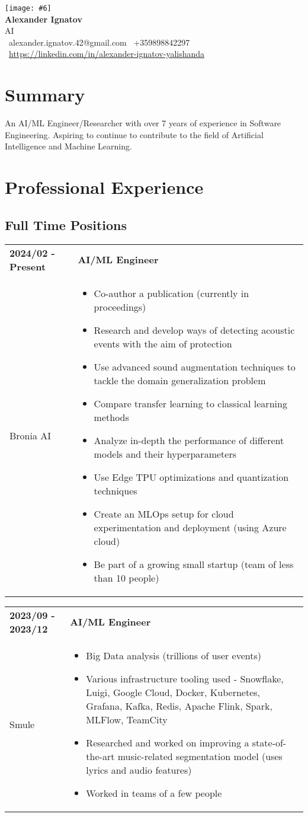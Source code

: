 \documentclass[11pt,a4paper]{article}
\newcommand{\cvheader}[6]{
    \begin{center}
        \texttt{[image: \#6]} \\[4pt]
            {\Huge\textbf{#1}}\\[4pt]
            {\large #2}\\[2pt]
            \faEnvelope\ #3 \quad \faPhone\ #4 \\[2pt]
            \faLinkedin\ \href{#5}{#5}
    \end{center}
}
\newcommand{\workblock}[4]{
    \begin{tabular}{p{0.25\columnwidth}p{0.65\columnwidth}}
        \textbf{#1} & \textbf{#2} \\
        #3 & #4 \\
    \end{tabular}
}
\begin{document}
\cvheader{Alexander Ignatov}
         {AI}
         {alexander.ignatov.42@gmail.com}
         {+359898842297}
         {https://linkedin.com/in/alexander-ignatov-yalishanda}
         {az.jpg}


\section{Summary}
An AI/ML Engineer/Researcher with over 7 years of experience in Software Engineering.
Aspiring to continue to contribute to the field of Artificial Intelligence and Machine Learning.

\section{Professional Experience}
    \subsection{Full Time Positions}
    \workblock{2024/02 - Present}{AI/ML Engineer}
    {Bronia AI}{
        \begin{itemize}
            \item Co-author a publication (currently in proceedings)
            \item Research and develop ways of detecting acoustic events with the aim of protection
            \item Use advanced sound augmentation techniques to tackle the domain generalization problem
            \item Compare transfer learning to classical learning methods
            \item Analyze in-depth the performance of different models and their hyperparameters
            \item Use Edge TPU optimizations and quantization techniques
            \item Create an MLOps setup for cloud experimentation and deployment (using Azure cloud)
            \item Be part of a growing small startup (team of less than 10 people)
        \end{itemize}
    }

    \workblock{2023/09 - 2023/12}{AI/ML Engineer}
    {Smule}{
        \begin{itemize}
            \item Big Data analysis (trillions of user events)
            \item Various infrastructure tooling used - Snowflake, Luigi, Google Cloud, Docker, Kubernetes, Grafana, Kafka, Redis, Apache Flink, Spark, MLFlow, TeamCity
            \item Researched and worked on improving a state-of-the-art music-related segmentation model (uses lyrics and audio features)
            \item Worked in teams of a few people
        \end{itemize}
    }
    
\end{document}
